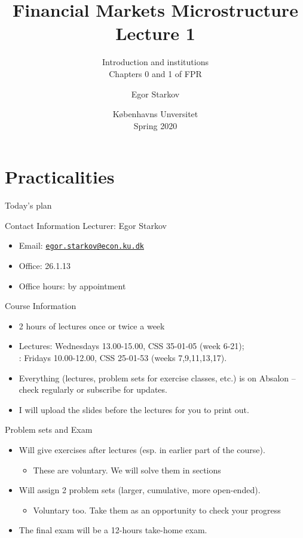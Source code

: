 \documentclass[english,10pt]{beamer}
\title{Financial Markets Microstructure \\ Lecture 1}
\subtitle{Introduction and institutions \\
Chapters 0 and 1 of FPR}
\author{Egor Starkov}
\date{K{\o}benhavns Unversitet \\
	Spring 2020}
\theoremstyle{definition}
\begin{document}
\frame[plain]{\titlepage}
\addtocounter{framenumber}{-1}



\section{Practicalities}

\begin{frame}{Today's plan}
\tableofcontents[]
\end{frame}


\begin{frame}{Contact Information}
Lecturer: Egor Starkov
\begin{itemize}
	\item Email: \href{mailto:egor.starkov@econ.ku.dk}{\texttt{egor.starkov@econ.ku.dk}}
	\item Office: 26.1.13
	\item Office hours: by appointment
\end{itemize}
\end{frame}


\begin{frame}{Course Information}
\begin{itemize}
	\item 2 hours of lectures once or twice a week
	\item \alert{Lectures}: Wednesdays 13.00-15.00, CSS 35-01-05 (week 6-21); 
		\\ : Fridays 10.00-12.00, CSS 25-01-53 (weeks 7,9,11,13,17).
	\item Everything (lectures, problem sets for exercise classes, etc.) is on Absalon -- check regularly or subscribe for updates.
	\item I will upload the slides before the lectures for you to print out.
\end{itemize}
\end{frame}


\begin{frame}{Problem sets and Exam}
\begin{itemize}
	\item Will give exercises after lectures (esp. in earlier part of the course).
	\begin{itemize}
		\item These are voluntary. We will solve them in sections
	\end{itemize}
	\item Will assign 2 problem sets (larger, cumulative, more open-ended).
	\begin{itemize}
		\item Voluntary too. Take them as an opportunity to check your progress
	\end{itemize}
	\item The final exam will be a 12-hours take-home exam.
\end{itemize}
\end{frame}
\end{document}
